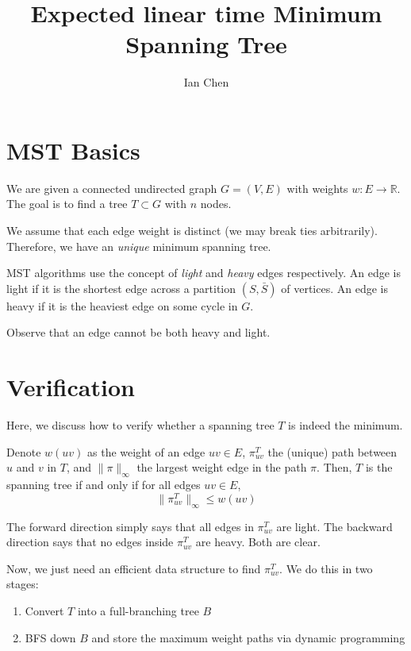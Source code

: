 \documentclass{article}
\title{Expected linear time Minimum Spanning Tree}
\author{Ian Chen}
\newcommand{\norm}[1]{\| #1 \|_{\infty}}
\begin{document}
\maketitle

\section{MST Basics}

We are given a connected undirected graph $G = (V, E)$ with weights $w: E \to \mathbb{R}$.
The goal is to find a tree $T \subset G$ with $n$ nodes.

We assume that each edge weight is distinct (we may break ties arbitrarily).
Therefore, we have an \emph{unique} minimum spanning tree.

MST algorithms use the concept of \emph{light} and \emph{heavy} edges respectively.
An edge is light if it is the shortest edge across a partition $(S, \bar{S})$ of vertices.
An edge is heavy if it is the heaviest edge on some cycle in $G$.

Observe that an edge cannot be both heavy and light.


\section{Verification}

Here, we discuss how to verify whether a spanning tree $T$ is indeed the minimum.

Denote $w(uv)$ as the weight of an edge $uv \in E$, $\pi^T_{uv}$ the (unique) path between $u$ and $v$ in $T$, and $\norm{\pi}$ the largest weight edge in the path $\pi$.
Then, $T$ is the spanning tree if and only if for all edges $uv \in E$,
$$
    \norm{\pi^T_{uv}} \le w(uv)
$$

The forward direction simply says that all edges in $\pi^T_{uv}$ are light.
The backward direction says that no edges inside $\pi^T_{uv}$ are heavy.
Both are clear.

Now, we just need an efficient data structure to find $\pi^T_{uv}$.
We do this in two stages:
\begin{enumerate}
    \item Convert $T$ into a full-branching tree $B$
    \item BFS down $B$ and store the maximum weight paths via dynamic programming
\end{enumerate}
\end{document}
